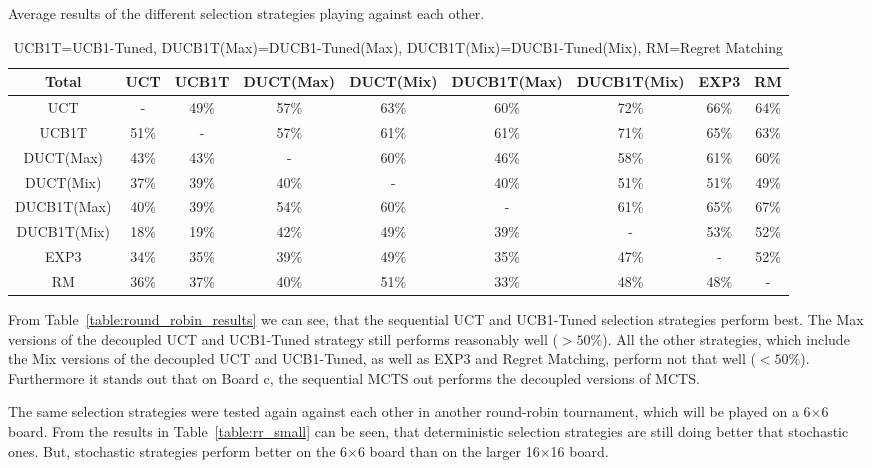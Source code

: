\documentclass{article}
\begin{document}
\begin{table}\scriptsize
\caption{Average results of the different selection strategies playing against each other.}
\centering
\begin{tabular}{|c||c|c|c|c|c|c|c|c|}
									\hline
  Total 		& UCT 	& UCB1T		& DUCT(Max)	& DUCT(Mix)	& DUCB1T(Max)	& DUCB1T(Mix)	& EXP3	& RM				\\ 	\hline\hline
  UCT 			&  -	& 49\%		& 57\%		& 63\%		& 60\%		& 72\%		& 66\%	& 64\%				\\ 	\hline
  UCB1T 		& 51\% 	& - 		& 57\%		& 61\%		& 61\%		& 71\%		& 65\%	& 63\%				\\ 	\hline
  DUCT(Max) 		& 43\% 	& 43\% 		& -		& 60\%		& 46\%		& 58\%		& 61\%	& 60\%				\\ 	\hline
  DUCT(Mix) 		& 37\% 	& 39\% 		& 40\%		& -		& 40\%		& 51\%		& 51\%	& 49\%				\\ 	\hline
  DUCB1T(Max)	 	& 40\% 	& 39\% 		& 54\%		& 60\%		& -		& 61\%		& 65\%	& 67\%				\\ 	\hline
  DUCB1T(Mix)	 	& 18\% 	& 19\% 		& 42\%		& 49\%		& 39\%		& -		& 53\%	& 52\%				\\ 	\hline
  EXP3 			& 34\%	& 35\% 		& 39\%		& 49\%		& 35\%		& 47\%		& -	& 52\%				\\ 	\hline
  RM		 	& 36\% 	& 37\%		& 40\%		& 51\%		& 33\%		& 48\%		& 48\%	& -				\\ 	\hline
\end{tabular}
\caption*{UCB1T=UCB1-Tuned, DUCB1T(Max)=DUCB1-Tuned(Max), DUCB1T(Mix)=DUCB1-Tuned(Mix), RM=Regret Matching}
\label{table:round_robin_total}
\end{table}

From Table~\ref{table:round_robin_results} we can see, that the sequential UCT and UCB1-Tuned selection strategies perform best. The Max versions of the decoupled UCT and UCB1-Tuned strategy still performs reasonably well ($>50\%$). All the other strategies, which include the Mix versions of the decoupled UCT and UCB1-Tuned, as well as EXP3 and Regret Matching, perform not that well ($<50\%$).\\
Furthermore it stands out that on Board c, the sequential MCTS out performs  the decoupled versions of MCTS.

The same selection strategies were tested again against each other in another round-robin tournament, which will be played on a 6$\times$6 board. From the results in Table~\ref{table:rr_small} can be seen, that deterministic selection strategies are still doing better that stochastic ones. But, stochastic strategies perform better on the 6$\times$6 board than on the larger 16$\times$16 board.
\end{document}
